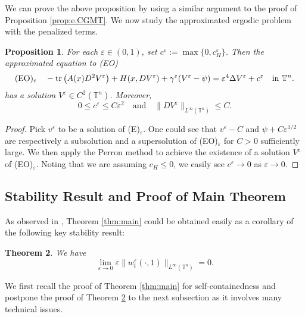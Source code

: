 \documentclass[12pt,reqno]{amsart}
\theoremstyle{plain}
\newtheorem{thm}{Theorem}[section]
\newtheorem{prop}[thm]{Proposition}
\theoremstyle{remark}
\numberwithin{equation}{section}
\begin{document}
We can prove the above proposition by using a similar argument to the proof of Proposition \ref{prop:e.CGMT}.
We now study the approximated ergodic problem with the penalized terms. 
\begin{prop}\label{prop:AEO}
For each ${\varepsilon} \in (0,1)$, set $c^{\varepsilon}:=\max\{0,c_H^{\varepsilon}\}$. 
Then the approximated equation to {\rm(EO)} 
$$
{\rm (EO)_{\varepsilon}} \quad
-{{\rm tr}\,}\big(A(x)D^2V^{\varepsilon}\big)+H(x,DV^{\varepsilon})+{\gamma}^{\varepsilon}(V^{\varepsilon}-\psi)
={\varepsilon}^4{\Delta} V^{\varepsilon} +c^{\varepsilon} \quad \textnormal{in} \ {\mathbb{T}}^n. 
$$
has a  solution $V^{\varepsilon} \in C^2({\mathbb{T}}^n)$.
Moreover, 
\[
0\le c^{\varepsilon}\le C{\varepsilon}^2 \quad \text{and} \quad \|DV^{\varepsilon}\|_{L^\infty({\mathbb{T}}^n)} \leq C.
\] 
\end{prop}

\begin{proof}
 Pick $v^{\varepsilon}$ to be a solution of (E)$_{\varepsilon}$.
One could see that $v^{\varepsilon}-C$ and $\psi+C{\varepsilon}^{1/2}$ are respectively a subsolution and a supersolution of (EO)$_{\varepsilon}$ for $C>0$ sufficiently large. We then apply the Perron method to achieve the existence of a solution $V^{\varepsilon}$ of (EO)$_{\varepsilon}$. 
Noting that we are assuming $c_H\le0$, we easily see $c^{\varepsilon}\to0$ as ${\varepsilon}\to0$. 
\end{proof}

\subsection{Stability Result and Proof of Main Theorem}
As observed in \cite{CGMT},  Theorem \ref{thm:main} could be obtained easily
as a corollary of the following key stability result: 

\begin{thm}\label{thm:key}
We have
$$
\lim_{{\varepsilon} \to 0}{\varepsilon} \|w^{\varepsilon}_t(\cdot,1)\|_{L^\infty({\mathbb{T}}^n)} = 0.
$$
\end{thm}
We first recall the proof of Theorem \ref{thm:main} for self-containedness 
and postpone the proof of Theorem \ref{thm:key} to the next subsection as it involves many technical issues. 
\end{document}

